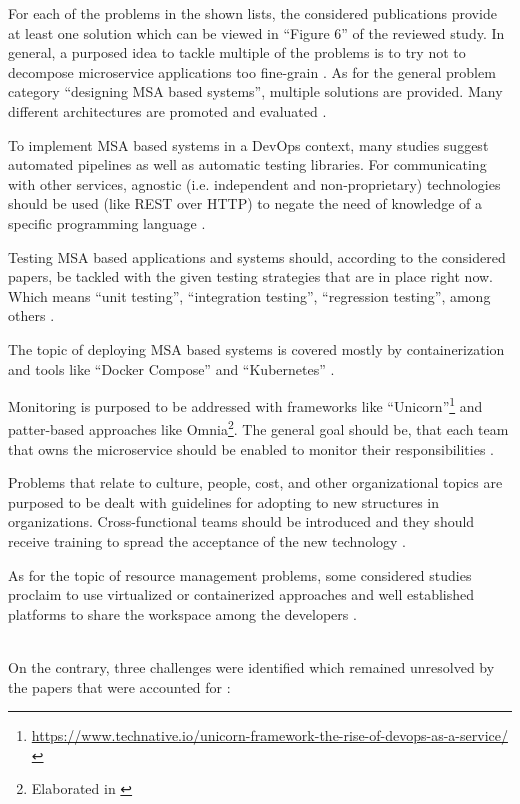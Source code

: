 For each of the problems in the shown lists, the considered publications
provide at least one solution which can be viewed in ``Figure 6''
of the reviewed study. In general, a purposed idea to tackle multiple
of the problems is to try not to decompose microservice applications
too fine-grain \cite{waseem:SMSMSADevOps}. As for the general problem
category ``designing MSA based systems'', multiple solutions are provided.
Many different architectures are promoted and evaluated \cite{waseem:SMSMSADevOps}.

To implement MSA based systems in a DevOps context, many studies suggest
automated pipelines as well as automatic testing libraries. For communicating
with other services, agnostic (i.e. independent and non-proprietary)
technologies should be used (like REST over HTTP)
to negate the need of knowledge of a specific programming language
\cite{waseem:SMSMSADevOps}.

Testing MSA based applications and systems should, according to the considered
papers, be tackled with the given testing strategies that are in place
right now. Which means ``unit testing'', ``integration testing'',
``regression testing'', among others \cite{waseem:SMSMSADevOps}.

The topic of deploying MSA based systems is covered mostly by containerization
and tools like ``Docker Compose'' and ``Kubernetes'' \cite{waseem:SMSMSADevOps}.

Monitoring is purposed to be addressed with frameworks like
``Unicorn''\footnote{\url{https://www.technative.io/unicorn-framework-the-rise-of-devops-as-a-service/}}
and patter-based approaches like Omnia\footnote{Elaborated in \cite{miglerina:Omnia}}.
The general goal should be, that each team that owns the microservice should be enabled
to monitor their responsibilities \cite{waseem:SMSMSADevOps}.

Problems that relate to culture, people, cost, and other organizational
topics are purposed to be dealt with guidelines for adopting to
new structures in organizations. Cross-functional teams should be introduced
and they should receive training to spread the acceptance of the
new technology \cite{waseem:SMSMSADevOps}.

As for the topic of resource management problems, some considered
studies proclaim to use virtualized or containerized approaches
and well established platforms to share the workspace among
the developers \cite{waseem:SMSMSADevOps}.

~\\
On the contrary, three challenges were identified which
remained unresolved by the papers that were accounted for \cite{waseem:SMSMSADevOps}:

